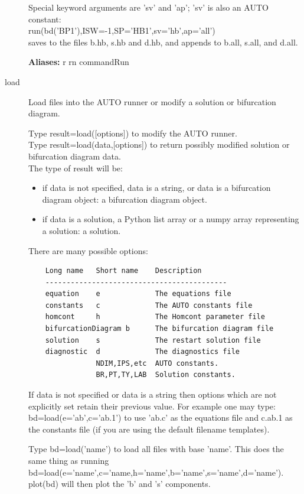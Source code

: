 \documentclass[12pt]{report}
\begin{document}
\begin{description}
    Special keyword arguments are 'sv' and 'ap'; 'sv' is also an AUTO
    constant:\\
    run(bd('BP1'),ISW=-1,SP='HB1',sv='hb',ap='all')\\
    saves to the files b.hb, s.hb and d.hb, and appends to b.all,
    s.all, and d.all.

    \textbf{Aliases:} r rn commandRun

\item[load]
Load files into the AUTO runner or modify a solution or bifurcation diagram.

    Type result=load([options]) to modify the AUTO runner.\\
    Type result=load(data,[options]) to return possibly
    modified solution or bifurcation diagram data.\\

    The type of result will be:
    \begin{itemize}
      \item
        if data is not specified, data is a string, or data is a
        bifurcation diagram object: a bifurcation diagram object.
      \item
        if data is a solution, a Python list array or a numpy array
        representing a solution: a solution.
    \end{itemize}

    There are many possible options:
    \begin{verbatim}
    Long name   Short name    Description
    -------------------------------------------
    equation    e             The equations file
    constants   c             The AUTO constants file
    homcont     h             The Homcont parameter file
    bifurcationDiagram b      The bifurcation diagram file
    solution    s             The restart solution file
    diagnostic  d             The diagnostics file
                NDIM,IPS,etc  AUTO constants.
                BR,PT,TY,LAB  Solution constants.
    \end{verbatim}
    If data is not specified or data is a string then options which
    are not explicitly set retain their previous value.
    For example one may type: bd=load(e='ab',c='ab.1') to use 'ab.c' as
    the equations file and c.ab.1 as the constants file (if you are
    using the default filename templates).

    Type bd=load('name') to load all files with base 'name'.
    This does the same thing as running
    bd=load(e='name',c='name,h='name',b='name',s='name',d='name').\\
    plot(bd) will then plot the 'b' and 's' components.
 

\end{description}
\end{document}
